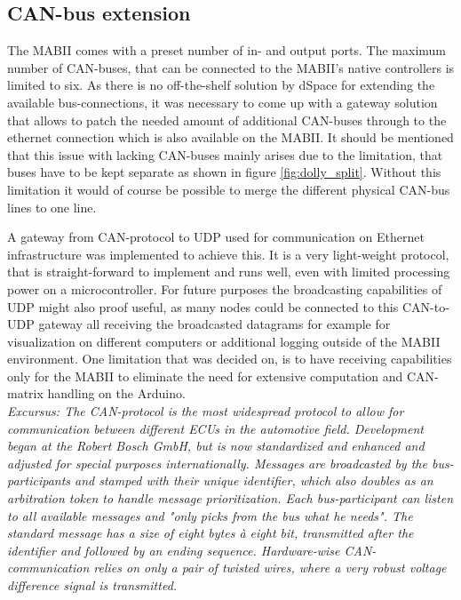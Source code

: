\documentclass[ExampleMasters.tex]{subfiles}
\begin{document}
\subsection{CAN-bus extension}
\label{sec:can_udp_gateway}
The \gls{MABII} comes with a preset number of in- and output ports. The maximum number of CAN-buses, that can be connected to the \gls{MABII}'s native controllers is limited to six. As there is no off-the-shelf solution by dSpace for extending the available bus-connections, it was necessary to come up with a gateway solution that allows to patch the needed amount of additional \gls{CAN}-buses through to the ethernet connection which is also available on the \gls{MABII}. It should be mentioned that this issue with lacking CAN-buses mainly arises due to the limitation, that buses have to be kept separate as shown in figure \ref{fig:dolly_split}. Without this limitation it would of course be possible to merge the different physical CAN-bus lines to one line.

A gateway from CAN-protocol to \gls{UDP} used for communication on Ethernet infrastructure was implemented to achieve this. It is a very light-weight protocol, that is straight-forward to implement and runs well, even with limited processing power on a microcontroller. For future purposes the broadcasting capabilities of \gls{UDP} might also proof useful, as many nodes could be connected to this \gls{CAN}-to-\gls{UDP} gateway all receiving the broadcasted datagrams for example for visualization on different computers or additional logging outside of the \gls{MABII} environment. One limitation that was decided on, is to have receiving capabilities only for the \gls{MABII} to eliminate the need for extensive computation and CAN-matrix handling on the Arduino. \\


\textit{Excursus: The \gls{CAN}-protocol is the most widespread protocol to allow for communication between different \gls{ECU}s in the automotive field. Development began at the Robert Bosch GmbH, but is now standardized and enhanced and adjusted for special purposes internationally. Messages are broadcasted by the bus-participants and stamped with their unique identifier, which also doubles as an arbitration token to handle message prioritization. Each bus-participant can listen to all available messages and "only picks from the bus what he needs". The standard message has a size of eight bytes \`{a} eight bit, transmitted after the identifier and followed by an ending sequence. Hardware-wise \gls{CAN}-communication relies on only a pair of twisted wires, where a very robust voltage difference signal is transmitted\cite{CAN_intro}.}\\
\end{document}

